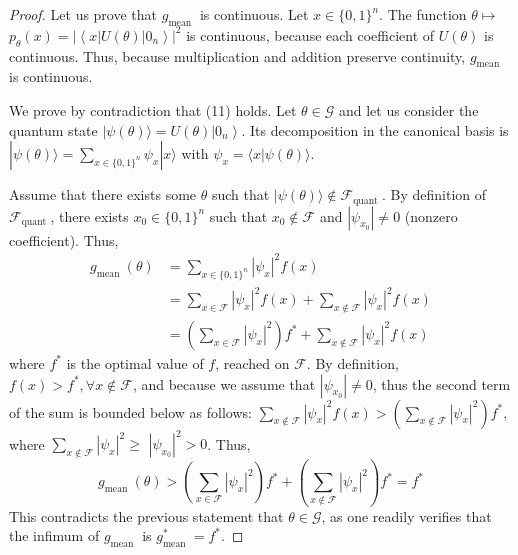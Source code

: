 \begin{proof}
Let us prove that $g_{\text {mean }}$ is continuous.
Let $x \in\{0,1\}^{n}$. The function $\theta \mapsto$ $p_{\theta}(x)=\left|\left\langle x|U(\theta)| 0_{n}\right\rangle\right|^{2}$ is continuous, because each coefficient of $U(\theta)$ is continuous. Thus, because multiplication and addition preserve continuity, $g_{\text {mean }}$ is continuous.

We prove by contradiction that (11) holds.
Let $\theta \in \mathcal{G}$ and let us consider the quantum state $|\psi(\theta)\rangle=U(\theta)\left|0_{n}\right\rangle$. Its decomposition in the canonical basis is $|\psi(\theta)\rangle=\sum_{x \in\{0,1\}^{n}} \psi_{x}|x\rangle$ with $\psi_{x}=\langle x|\psi(\theta)\rangle$. %

Assume that there exists some $\theta$ such that $|\psi(\theta)\rangle \notin \mathcal{F}_{\text {quant }}$. By definition of $\mathcal{F}_{\text {quant }}$, there exists $x_{0} \in\{0,1\}^{n}$ such that $x_{0} \notin \mathcal{F}$ and $\left|\psi_{x_{0}}\right| \neq 0$ (nonzero coefficient). Thus,
\begin{equation}
\begin{aligned}
g_{\text {mean }}(\theta) & =\sum_{x \in\{0,1\}^{n}}\left|\psi_{x}\right|^{2} f(x) \\
& =\sum_{x \in \mathcal{F}}\left|\psi_{x}\right|^{2} f(x)+\sum_{x \notin \mathcal{F}}\left|\psi_{x}\right|^{2} f(x) \\
& =\left(\sum_{x \in \mathcal{F}}\left|\psi_{x}\right|^{2}\right) f^{*}+\sum_{x \notin \mathcal{F}}\left|\psi_{x}\right|^{2} f(x)
\end{aligned}
\end{equation}
where $f^{*}$ is the optimal value of $f$, reached on $\mathcal{F}$. By definition, $f(x)>f^{*}, \forall x \notin \mathcal{F}$, and because we assume that $\left|\psi_{x_{0}}\right| \neq 0$, thus the second term of the sum is bounded below as follows: $\sum_{x \notin \mathcal{F}}\left|\psi_{x}\right|^{2} f(x)>\left(\sum_{x \notin \mathcal{F}}\left|\psi_{x}\right|^{2}\right) f^{*}$, where $\sum_{x \notin \mathcal{F}}\left|\psi_{x}\right|^{2} \geq$ $\left|\psi_{x_{0}}\right|^{2}>0$. Thus,
\begin{equation}
    g_{\text {mean }}(\theta)>\left(\sum_{x \in \mathcal{F}}\left|\psi_{x}\right|^{2}\right) f^{*}+\left(\sum_{x \notin \mathcal{F}}\left|\psi_{x}\right|^{2}\right) f^{*}=f^{*}
\end{equation}
This contradicts the previous statement that $\theta \in \mathcal{G}$, as one readily verifies that the infimum of $g_{\text {mean }}$ is $g_{\text {mean }}^{*}=f^{*}$.
\end{proof}

